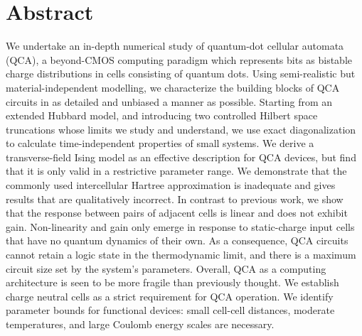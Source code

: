 \chapter*{Abstract}

\begin{doublespace}
We undertake an in-depth numerical study of quantum-dot cellular automata (QCA),
a beyond-CMOS computing paradigm which represents bits as bistable charge
distributions in cells consisting of quantum dots. Using semi-realistic but
material-independent modelling, we characterize the building blocks of QCA
circuits in as detailed and unbiased a manner as possible.  Starting from an
extended Hubbard model, and introducing two controlled Hilbert space truncations
whose limits we study and understand, we use exact diagonalization to calculate
time-independent properties of small systems. We derive a transverse-field Ising
model as an effective description for QCA devices, but find that it is only
valid in a restrictive parameter range. We demonstrate that the commonly used
intercellular Hartree approximation is inadequate and gives results that are
qualitatively incorrect. In contrast to previous work, we show that the
response between pairs of adjacent cells is linear and does not exhibit gain.
Non-linearity and gain only emerge in response to static-charge input cells that
have no quantum dynamics of their own. As a consequence, QCA circuits cannot
retain a logic state in the thermodynamic limit, and there is a maximum circuit
size set by the system's parameters. Overall, QCA as a computing architecture is
seen to be more fragile than previously thought. We establish charge neutral
cells as a strict requirement for QCA operation. We identify parameter bounds
for functional devices: small cell-cell distances, moderate temperatures, and
large Coulomb energy scales are necessary.
\end{doublespace}
